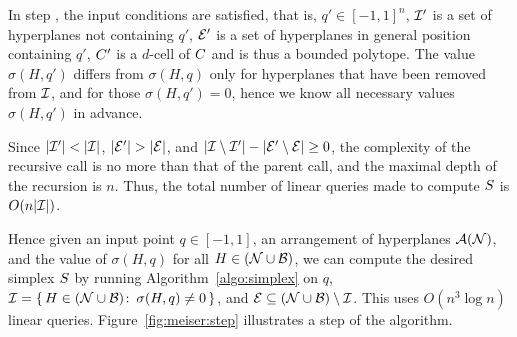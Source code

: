 In step , the input conditions are satisfied, that is, $q' \in
{[-1,1]}^n$, \(\mathcal{I}'\) is a set of hyperplanes not containing \(q'\), \(\mathcal{E}'\) is
a set of hyperplanes in general position containing \(q'\), \(C'\) is a
$d$-cell of \(C\) and is thus a bounded polytope. The value \(\sigma(H,q')\)
differs from \(\sigma(H,q)\) only for hyperplanes that have been removed from
\(\mathcal{I}\), and for those \(\sigma(H,q') = 0\), hence we know all necessary values
\(\sigma(H,q')\) in advance.

Since \(|{\mathcal{I}'}| < |{\mathcal{I}}|\), \(|{\mathcal{E}'}| > |{\mathcal{E}}|\), and
\(|{\mathcal{I}\setminus\mathcal{I}'}| - |{\mathcal{E}'\setminus\mathcal{E}}| \ge 0\), the complexity of the
recursive call is no more than that of the parent call, and the maximal depth
of the recursion is \(n\). Thus, the total number of
linear queries made to compute \(S\) is \(O(n|{\mathcal{I}}|)\).

Hence given an input point \(q \in [-1,1]\), an arrangement of hyperplanes
\(\mathcal{A}(\mathcal{N})\), and the value of \(\sigma(H,q)\) for all
\(H \in (\mathcal{N}\cup\mathcal{B})\), we can compute the desired simplex \(S\)
by running Algorithm~\ref{algo:simplex} on \(q\),
\(\mathcal{I}=\{\,H \in (\mathcal{N}\cup\mathcal{B}) \colon\, \sigma(H,q) \neq 0\,\}\), and
\(\mathcal{E} \subseteq (\mathcal{N}\cup\mathcal{B}) \setminus\mathcal{I}\).
This uses $O(n^3 \log n)$ linear queries.
Figure~\ref{fig:meiser:step} illustrates a step of the algorithm.

